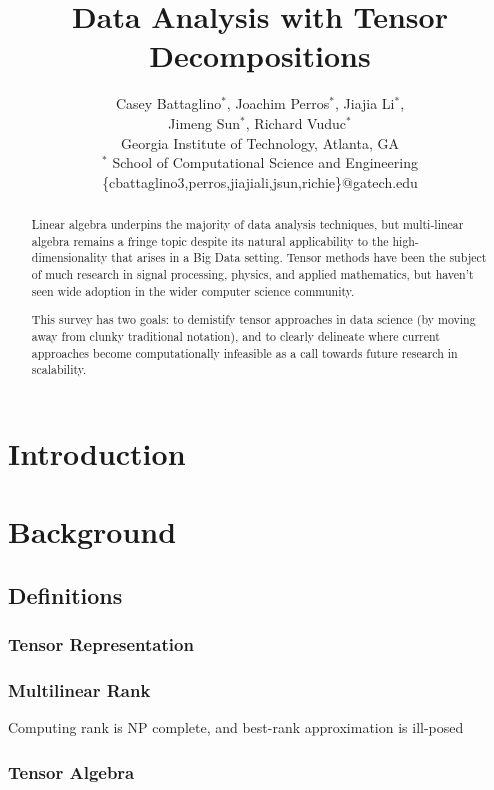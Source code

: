 \documentclass[10pt]{article}
\title{Data Analysis with Tensor Decompositions}
\author{
  Casey Battaglino$^\ast$, Joachim Perros$^\ast$, Jiajia Li$^\ast$, \\
   Jimeng Sun$^\ast$, Richard Vuduc$^\ast$
  \\ Georgia Institute of Technology, Atlanta, GA
  \\ $^\ast$ School of Computational Science and Engineering \\
  \{cbattaglino3,perros,jiajiali,jsun,richie\}@gatech.edu } \date{}
\begin{document}

\maketitle

\begin{abstract}
Linear algebra underpins the majority of data analysis techniques, but multi-linear algebra remains a fringe topic despite its natural applicability to the high-dimensionality that arises in a Big Data setting. Tensor methods have been the subject of much research in signal processing, physics, and applied mathematics, but haven't seen wide adoption in the wider computer science community.

This survey has two goals: to demistify tensor approaches in data science (by moving away from clunky traditional notation), and to clearly delineate where current approaches become computationally infeasible as a call towards future research in scalability.


\end{abstract}

\tableofcontents
\section{Introduction} \label{sec:intro}

\section{Background} \label{sec:background}
\subsection{Definitions} \label{sec:definitions}
\subsubsection{Tensor Representation}
\subsubsection{Multilinear Rank}
Computing rank is NP complete, and best-rank approximation is ill-posed~\cite{Kolda09tensordecompositions}
\subsubsection{Tensor Algebra}
\end{document}
